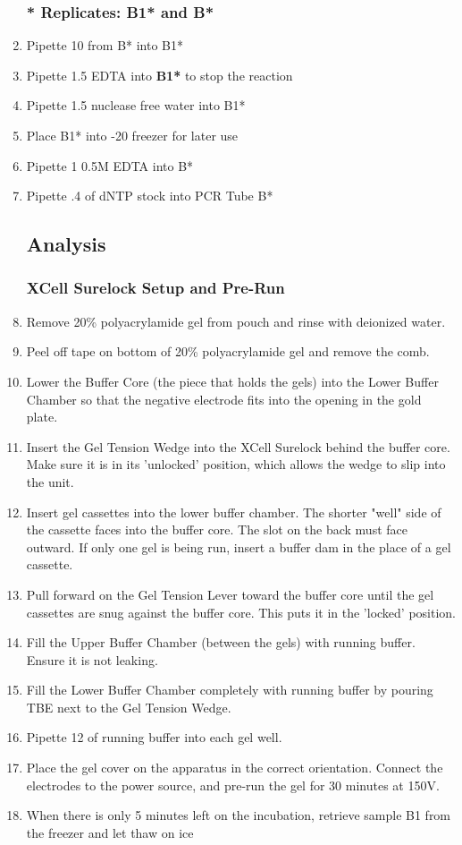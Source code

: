 \documentclass{ssiBio}
\begin{document}
\begin{enumerate}
\subsubsection{\textbf{*} Replicates: B1* and B*}
\item{Pipette 10\uL{} from B* into B1*\label{2B1}}
\item{Pipette 1.5\uL{} EDTA into \textbf{B1*} to stop the reaction \cite{Invitrogen2002}\label{2B2}}
\item{Pipette 1.5\uL{} nuclease free water into B1*\label{2B3}}
\item{Place B1* into -20\C{} freezer for later use\label{2B4}}
\item{Pipette 1\uL{} 0.5M EDTA into B*\label{2B5}}
\item{Pipette .4\uL{} of dNTP stock into PCR Tube B*\label{2B6}}

\RstopPoint{} 
\subsection{Analysis}
\subsubsection{XCell Surelock Setup and Pre-Run}
\item{Remove 20\% polyacrylamide gel from pouch and rinse with deionized water.}
\item{Peel off tape on bottom of 20\% polyacrylamide gel and remove the comb.}
\item{Lower the Buffer Core (the piece that holds the gels) into the Lower Buffer Chamber so that the negative electrode fits into the opening in the gold plate.}
\item{Insert the Gel Tension Wedge into the XCell Surelock behind the buffer core. Make sure it is in its 'unlocked' position, which allows the wedge to slip into the unit.}
\item{Insert gel cassettes into the lower buffer chamber. The shorter "well" side of the cassette faces into the buffer core. The slot on the back must face outward. If only one gel is being run, insert a buffer dam in the place of a gel cassette.}
\item{Pull forward on the Gel Tension Lever toward the buffer core until the gel cassettes are snug against the buffer core. This puts it in the 'locked' position.}
\item{Fill the Upper Buffer Chamber (between the gels) with running buffer. Ensure it is not leaking.}
\item{Fill the Lower Buffer Chamber completely with running buffer by pouring TBE next to the Gel Tension Wedge.}
\item{Pipette 12\uL{} of running buffer into each gel well.}
\item{Place the gel cover on the apparatus in the correct orientation. Connect the electrodes to the power source, and pre-run the gel for 30 minutes at 150V.}
\item{When there is only 5 minutes left on the incubation, retrieve sample B1 from the freezer and let thaw on ice}

\end{enumerate}
\end{document}
